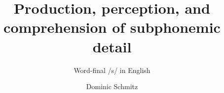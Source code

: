 \author{Dominic Schmitz} 
\title{Production, perception, and comprehension of subphonemic detail}
\subtitle{Word-final /s/ in English}
\renewcommand{\lsSeries}{} 
\newcommand{\lsSeriesTitle}{} 
\newcommand{\lsSeriesColor}{purple} 
\renewcommand{\lsSeriesNumber}{} 
